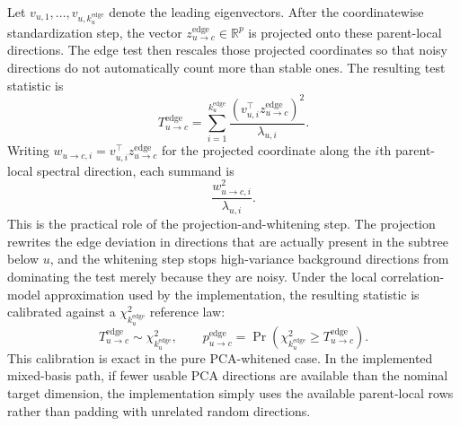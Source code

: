 Let $v_{u,1},\dots,v_{u,k_u^{\mathrm{edge}}}$ denote the leading eigenvectors.
After the coordinatewise standardization step, the vector
$z_{u \to c}^{\mathrm{edge}} \in \mathbb{R}^p$ is projected onto these
parent-local directions. The edge test then rescales those projected
coordinates so that noisy directions do not automatically count more than
stable ones. The resulting test statistic is
\begin{equation}
T_{u \to c}^{\mathrm{edge}}
=
\sum_{i=1}^{k_u^{\mathrm{edge}}}
\frac{(v_{u,i}^\top z_{u \to c}^{\mathrm{edge}})^2}{\lambda_{u,i}}.
\end{equation}
Writing
$w_{u \to c,i} = v_{u,i}^\top z_{u \to c}^{\mathrm{edge}}$ for the projected
coordinate along the $i$th parent-local spectral direction, each summand is
\begin{equation}
\frac{w_{u \to c,i}^2}{\lambda_{u,i}}.
\end{equation}
This is the practical role of the projection-and-whitening step. The projection
rewrites the edge deviation in directions that are actually present in the
subtree below $u$, and the whitening step stops high-variance background
directions from dominating the test merely because they are noisy.
Under the local correlation-model approximation used by the implementation, the
resulting statistic is calibrated against a $\chi^2_{k_u^{\mathrm{edge}}}$
reference law:
\begin{equation}
T_{u \to c}^{\mathrm{edge}} \sim \chi^2_{k_u^{\mathrm{edge}}},
\qquad
p_{u \to c}^{\mathrm{edge}}
=
\Pr\!\left(
\chi^2_{k_u^{\mathrm{edge}}}
\ge
T_{u \to c}^{\mathrm{edge}}
\right).
\end{equation}
This calibration is exact in the pure PCA-whitened case. In the implemented
mixed-basis path, if fewer usable PCA directions are available than the
nominal target dimension, the implementation simply uses the available
parent-local rows rather than padding with unrelated random directions.
